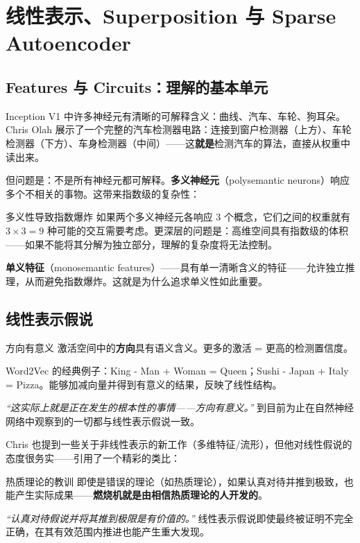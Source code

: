 \section{线性表示、Superposition 与 Sparse Autoencoder}

\subsection{Features 与 Circuits：理解的基本单元}

Inception V1 中许多神经元有清晰的可解释含义：曲线、汽车、车轮、狗耳朵。Chris Olah 展示了一个完整的汽车检测器电路：连接到窗户检测器（上方）、车轮检测器（下方）、车身检测器（中间）——这\textbf{就是}检测汽车的算法，直接从权重中读出来。

但问题是：不是所有神经元都可解释。\textbf{多义神经元}（polysemantic neurons）响应多个不相关的事物。这带来指数级的复杂性：

\begin{warningbox}{多义性导致指数爆炸}
如果两个多义神经元各响应 3 个概念，它们之间的权重就有 $3 \times 3 = 9$ 种可能的交互需要考虑。更深层的问题是：高维空间具有指数级的体积——如果不能将其分解为独立部分，理解的复杂度将无法控制。

\textbf{单义特征}（monosemantic features）——具有单一清晰含义的特征——允许独立推理，从而避免指数爆炸。这就是为什么追求单义性如此重要。
\end{warningbox}

\subsection{线性表示假说}

\begin{importantbox}{方向有意义}
激活空间中的\textbf{方向}具有语义含义。更多的激活 = 更高的检测置信度。

Word2Vec 的经典例子：King - Man + Woman = Queen；Sushi - Japan + Italy = Pizza。能够加减向量并得到有意义的结果，反映了线性结构。

\textit{``这实际上就是正在发生的根本性的事情——方向有意义。''} 到目前为止在自然神经网络中观察到的一切都与线性表示假说一致。
\end{importantbox}

Chris 也提到一些关于非线性表示的新工作（多维特征/流形），但他对线性假说的态度很务实——引用了一个精彩的类比：

\begin{knowledgebox}{热质理论的教训}
即使是错误的理论（如热质理论），如果认真对待并推到极致，也能产生实际成果——\textbf{燃烧机就是由相信热质理论的人开发的}。

\textit{``认真对待假说并将其推到极限是有价值的。''} 线性表示假说即使最终被证明不完全正确，在其有效范围内推进也能产生重大发现。
\end{knowledgebox}

